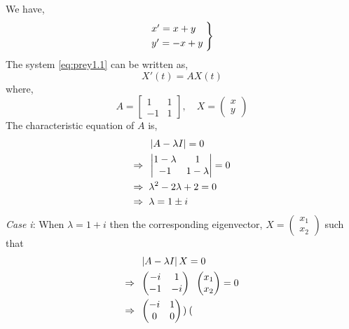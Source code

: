 \documentclass[../main-sheet.tex]{subfiles}
\begin{document}
\begin{soln}
    We have,
    \begin{equation}
        \begin{rcases}
            x'=x+y\quad\\
            y'=-x+y
        \end{rcases}
        \label{eq:prey1.1}
    \end{equation}
    The system \eqref{eq:prey1.1} can be written as,
    \[X'(t)=AX(t)\]
    where,
    \[A=\begin{bmatrix}
        1&1\\
        -1&1
    \end{bmatrix},\quad X=\begin{pmatrix}
        x\\
        y
    \end{pmatrix}\]
    The characteristic equation of \(A \) is,
    \begin{align*}
        &\left\vert A-\lambda I\right\vert=0\\
        \Rightarrow\;\;&\begin{vmatrix}
            1-\lambda & 1\\
            -1 & 1-\lambda
        \end{vmatrix}=0\\
        \Rightarrow\;\;&\lambda^2-2\lambda+2=0\\
        \Rightarrow\;\;&\lambda=1\pm i
    \end{align*}
    \emph{Case i}: When \(\lambda=1+i\) then the corresponding eigenvector, \(\displaystyle X=\begin{pmatrix}
        x_1\\
        x_2
    \end{pmatrix}\) such that
    \begin{align*}
        &\left\vert A-\lambda I\right\vert X=0\\
        \Rightarrow\;\;&\begin{pmatrix}
            -i&1\\
            -1&-i
        \end{pmatrix}\;\;\begin{pmatrix}
            x_1\\
            x_2
        \end{pmatrix}=0\\
        \Rightarrow\;\;&\begin{pmatrix}
            -i&1\\
            0&0
        \end{pmatrix}\;\;\begin{pmatrix}

\end{pmatrix}
\end{align*}
\end{soln}
\end{document}
